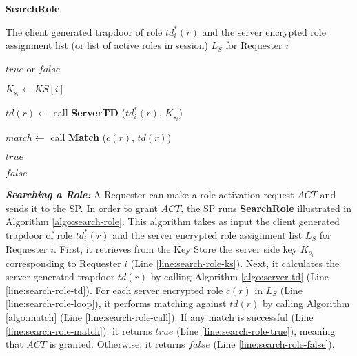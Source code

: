 \documentclass[final,5p,times,twocolumn]{elsarticle}
\newcommand{\algofontsize}{\fontsize{7}{8}\selectfont}
\begin{document}
\begin{algorithm}[htp]
{\algofontsize
\caption{\textbf{SearchRole}}

\label{algo:search-role}

\begin{algorithmic}[1]

\REQUIRE The client generated trapdoor of role $td^*_i (r)$ and the server encrypted role assignment list (or list of active roles in session) $L_{S}$ for Requester $i$

\ENSURE $\mathit{true}$ or $\mathit{false}$

\medskip

\STATE $K_{s_i} \leftarrow KS[i]$ {\algofontsize {}} \label{line:search-role-ks}

\STATE $td(r) \leftarrow$ call \textbf{ServerTD} ($td^*_i (r)$, $K_{s_i}$) \label{line:search-role-td}

 \label{line:search-role-loop}

	\STATE $match \leftarrow$ call \textbf{Match} ($c(r)$, $td(r)$) {\algofontsize {}} \label{line:search-role-call}

	 \label{line:search-role-match}
		\RETURN $\mathit{true}$ \label{line:search-role-true}
	\ENDIF

\ENDFOR

\RETURN $\mathit{false}$ \label{line:search-role-false}

\end{algorithmic}
}
\end{algorithm}


\emph{\textbf{Searching a Role:}} 
A Requester can make a role activation request $\mathit{ACT}$ and sends it to the SP. In order to grant $\mathit{ACT}$, the SP runs \textbf{SearchRole} illustrated in Algorithm \ref{algo:search-role}. This algorithm takes as input the client generated trapdoor of role $td^*_i (r)$ and the server encrypted role assignment list $L_{S}$ for Requester $i$. First, it retrieves from the Key Store the server side key $K_{s_i}$ corresponding to Requester $i$ (Line \ref{line:search-role-ks}). Next, it calculates the server generated trapdoor $td(r)$ by calling Algorithm \ref{algo:server-td} (Line \ref{line:search-role-td}). For each server encrypted role $c(r)$ in $L_{S}$ (Line \ref{line:search-role-loop}), it performs matching against $td(r)$ by calling Algorithm \ref{algo:match} (Line \ref{line:search-role-call}). If any match is successful (Line \ref{line:search-role-match}), it returns $\mathit{true}$ (Line \ref{line:search-role-true}), meaning that $\mathit{ACT}$ is granted. Otherwise, it returns $\mathit{false}$ (Line \ref{line:search-role-false}).
\end{document}
